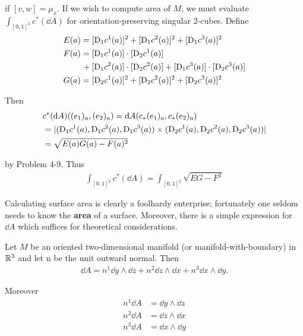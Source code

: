if $[v, w]=\mu_x$. If we wish to compute area of $M$, we must evaluate $\int_{[0,1]^2} c^*(\dd A)$ for 
orientation-preserving singular 2-cubes. Define 
\begin{align*}
    & E(a) = [\mathrm{D}_1c^1(a)]^2 + [\mathrm{D}_1c^2(a)]^2 + [\mathrm{D}_1c^3(a)]^2\\
    & F(a) = [\mathrm{D}_1c^1(a)]\cdot[\mathrm{D}_2c^1(a)] \\
    & \hspace*{2.2em} + [\mathrm{D}_1c^2(a)]\cdot[\mathrm{D}_2c^2(a)] + [\mathrm{D}_1c^3(a)]\cdot[\mathrm{D}_2c^3(a)]\\
    & G(a) = [\mathrm{D}_2c^1(a)]^2 + [\mathrm{D}_2c^2(a)]^2 + [\mathrm{D}_2c^3(a)]^2
\end{align*}

Then 
\begin{align*}
    & c^*(\mathrm{d} A)((e_1)_a, (e_2)_a) = \mathrm{d} A(c_*(e_1)_a, c_*(e_2)_a) \\
    & = |(\mathrm{D}_1c^1(a), \mathrm{D}_1c^2(a), \mathrm{D}_1c^3(a)) \times (\mathrm{D}_2c^1(a), \mathrm{D}_2c^2(a), \mathrm{D}_2c^3(a))| \\
    & = \sqrt{E(a)G(a) - F(a)^2}
\end{align*}

by Problem 4-9. Thus 
\begin{align*}
    \int_{[0,1]^2} c^*(\dd A) = \int_{[0,1]^2} \sqrt{EG-F^2}
\end{align*}

Calculating surface area is clearly a foolhardy enterprise;
fortunately one seldom needs to know the \textbf{area} of a surface.
Moreover, there is a simple expression for $\dd A$ which suffices for
theoretical considerations.

\begin{theorem}
    Let $M$ be an oriented two-dimensional manifold (or manifold-with-boundary) in $\mathbb{R}^3$ 
    and let n be the unit outward normal. Then
    \begin{align}
        \dd A=n^1\dd y\wedge\dd z+n^2\dd z\wedge\dd x+n^3\dd x\wedge\dd y.
    \end{align}

    Moreover 
    \begin{align}
        n^1\dd A & = \dd y\wedge \dd z\\
        n^2\dd A & = \dd z\wedge \dd x\\
        n^3\dd A & = \dd x\wedge \dd y
    \end{align}
\end{theorem}

